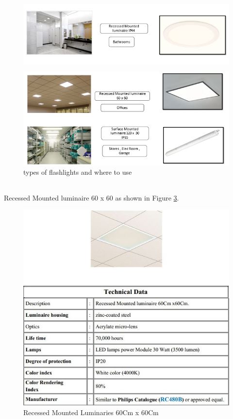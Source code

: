 \documentclass[12pt,fleqn]{book} %
\begin{document}
\begin{figure}[!h]
    \centering
    \includegraphics[width=1\linewidth]{f 2.png}
   
    \label{fig:f 2}
\end{figure}
\begin{figure}[!h]
    \centering
    \includegraphics[width=1\linewidth]{f 3.png}
    \caption{types of flashlights and where to use}
  
    \label{fig:f 3}
\end{figure}
\newpage
\\Recessed Mounted luminaire 60 x 60 as shown in Figure \ref{fig:fikry 9}.
\begin{figure}[!h]
    \centering
    \includegraphics[width=1\linewidth]{fikry 9.png}
    \caption{Recessed Mounted Luminaries 60Cm x 60Cm}
    \label{fig:fikry 9}
\end{figure}
\end{document}
